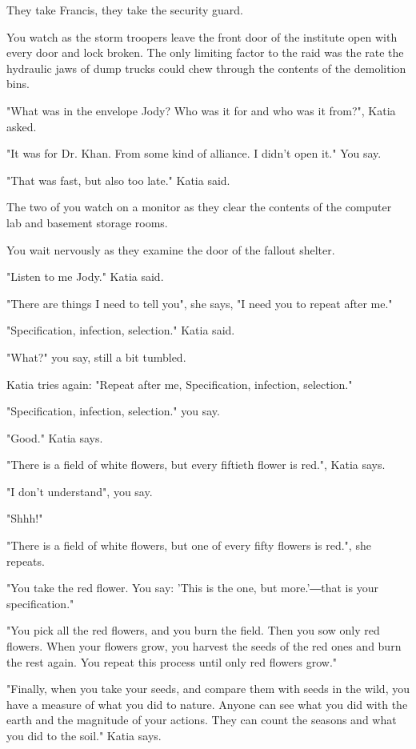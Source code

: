 \documentclass[a5paper, symmetric]{tufte-book}
\begin{document}
They take Francis, they take the security guard. 

You watch as the storm troopers leave the front door of the institute open with every door and lock broken. The only limiting factor to the raid was the rate the hydraulic jaws of dump trucks could chew through the contents of the demolition bins. 

"What was in the envelope Jody? Who was it for and who was it from?", Katia asked. 

"It was for Dr. Khan. From some kind of alliance. I didn't open it." You say. 

"That was fast, but also too late." Katia said. 

The two of you watch on a monitor as they clear the contents of the computer lab and basement storage rooms. 

You wait nervously as they examine the door of the fallout shelter. 

"Listen to me Jody." Katia said.

"There are things I need to tell you", she says, "I need you to repeat after me."

"Specification, infection, selection." Katia said. 

"What?" you say, still a bit tumbled. 

Katia tries again: "Repeat after me,  Specification, infection, selection."

"Specification, infection, selection." you say. 

"Good." Katia says. 

"There is a field of white flowers, but every fiftieth flower is red.", Katia says.

"I don't understand", you say.

"Shhh!"

"There is a field of white flowers, but one of every fifty flowers is red.", she repeats.

"You take the red flower. You say: 'This is the one, but more.'―that is your specification."

"You pick all the red flowers, and you burn the field. Then you sow only red flowers. When your flowers grow, you harvest the seeds of the red ones and burn the rest again. You repeat this process until only red flowers grow."

"Finally, when you take your seeds, and compare them with seeds in the wild, you have a measure of what you did to nature. Anyone can see what you did with the earth and the magnitude of your actions. They can count the seasons and what you did to the soil." Katia says.
\end{document}
